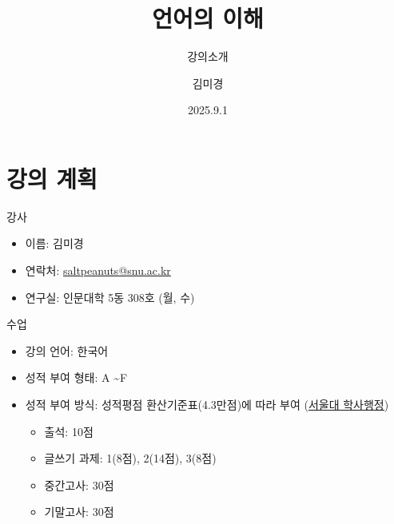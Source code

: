\documentclass[11pt, aspectratio=169]{beamer}
\title[언어의 이해]{언어의 이해}
\subtitle{강의소개}
\author{김미경}
\date{2025.9.1}
\begin{document}
\begin{frame}
  \titlepage
\end{frame}


\section{강의 계획}

\begin{frame}[t]{}

  \begin{block}{강사}
    \begin{itemize}
      \item 이름: 김미경
      \item 연락처: \underline{saltpeanuts@snu.ac.kr}
      \item 연구실: 인문대학 5동 308호 (월, 수)
    \end{itemize}
  \end{block}

  \begin{block}{수업}
    \begin{itemize}
      \item 강의 언어: 한국어
      \item 성적 부여 형태: A \textasciitilde F
      \item 성적 부여 방식: 성적평점 환산기준표(4.3만점)에 따라 부여 (\href{https://www.snu.ac.kr/academics/resources/certificate/grading}{\underline{서울대 학사행정}})
        \begin{itemize}
          \item 출석: 10점
          \item 글쓰기 과제: 1(8점), 2(14점), 3(8점)
          \item 중간고사: 30점
          \item 기말고사: 30점
        \end{itemize}
    \end{itemize}    
  \end{block}
\end{frame}
\end{document}
